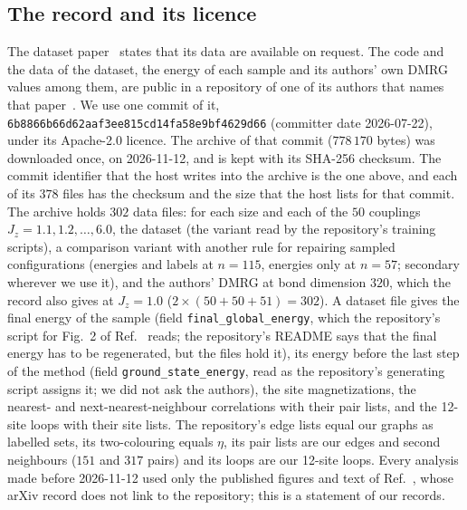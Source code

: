 \documentclass[aps,prx,onecolumn,10pt,nofootinbib,longbibliography,floatfix]{revtex4-2}
\theoremstyle{remark}
\newcommand{\Jz}{J_z}
\begin{document}
\subsection{The record and its licence}
The dataset paper~\cite{jaderberg2026} states that its data are available on request. The code and the data of the
dataset, the energy of each sample and its authors' own DMRG values among them, are public in a repository of one
of its authors that names that paper~\cite{jaderberg2026data}. We use one commit of it, \texttt{6b8866b66d62aaf3ee815cd14fa58e9bf4629d66}
(committer date 2026-07-22), under its Apache-2.0 licence. The archive of that commit ($778\,170$ bytes) was %
downloaded once, on 2026-11-12, and is kept with its SHA-256 checksum. The commit identifier that the host writes %
into the archive is the one above, and each of its $378$ files has the checksum and the size that the host lists for %
that commit. The archive holds $302$ data files: for each size and each of the $50$ couplings $\Jz=1.1,1.2,\dots,6.0$, %
the dataset (the variant read by the repository's training scripts), a comparison variant with another rule for
repairing sampled configurations (energies and labels at $n=115$, energies only at $n=57$; secondary wherever we use
it), and the authors' DMRG at bond dimension $320$, which the record also gives at $\Jz=1.0$ %
($2\times(50+50+51)=302$). A dataset file gives the final energy of the sample (field %
\texttt{final\_global\_energy}, which the repository's script for Fig.~2 of Ref.~\cite{jaderberg2026} reads; the %
repository's README says that the final energy has to be regenerated, but the files hold it), its energy before the
last step of the method (field \texttt{ground\_state\_energy}, read as the repository's generating script assigns it; we did not ask the authors), the site magnetizations, the nearest- and next-nearest-neighbour correlations
with their pair lists, and the 12-site loops with their site lists. The repository's edge lists equal our graphs as %
labelled sets, its two-colouring equals $\eta$, its pair lists are our edges and second neighbours ($151$ and $317$ %
pairs) and its loops are our 12-site loops. Every analysis made before 2026-11-12 used only the published figures %
and text of Ref.~\cite{jaderberg2026}, whose arXiv record does not link to the repository; this is a statement of
our records.
\end{document}
